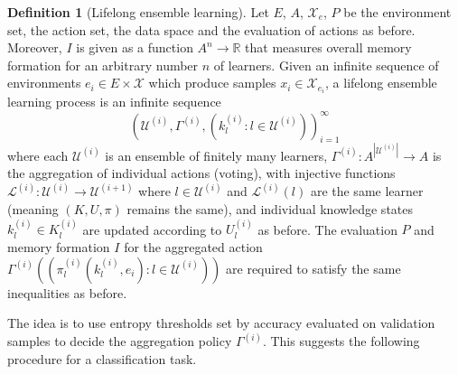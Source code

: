 \documentclass{article}
\theoremstyle{plain}
\theoremstyle{definition}
\newtheorem{definition}[theorem]{Definition}
\theoremstyle{remark}
\newcommand{\R}{\mathbb{R}}
\newcommand{\cX}{\mathcal{X}}
\newcommand{\cU}{\mathcal{U}}
\newcommand{\cL}{\mathcal{L}}
\begin{document}
\begin{definition}[Lifelong ensemble learning]
	\label{def:lifelong_ensemble}
	Let $E$, $A$, $\cX_e$, $P$ be the environment set, the action set, the data space and the evaluation of actions as before. Moreover, $I$ is given as a function $A^n \to \R$ that measures overall memory formation for an arbitrary number $n$ of learners.
	Given an infinite sequence of environments $e_i \in E \times \cX$ which produce samples $x_i \in \cX_{e_i}$,
	a lifelong ensemble learning process is an infinite sequence 
	$$(\cU^{(i)},\Gamma^{(i)}, (k^{(i)}_l:l \in \cU^{(i)}))_{i=1}^\infty$$ 
	where each $\cU^{(i)}$ is an ensemble of finitely many learners, $\Gamma^{(i)}: A^{|\cU^{(i)}|} \to A$ is the aggregation of individual actions (voting), with injective functions $\cL^{(i)}: \cU^{(i)}\to \cU^{(i+1)}$ where $l\in \cU^{(i)}$ and $\cL^{(i)}(l)$ are the same learner (meaning $(K,U,\pi)$ remains the same), and individual knowledge states $k^{(i)}_l\in K^{(i)}_l$ are updated according to $U^{(i)}_l$ as before. The evaluation $P$ and memory formation $I$ for the aggregated action $\Gamma^{(i)}((\pi^{(i)}_l(k_l^{(i)},e_i): l \in \cU^{(i)}))$ are required to satisfy the same inequalities as before.
\end{definition}

The idea is to use entropy thresholds set by accuracy evaluated on validation samples to decide the aggregation policy $\Gamma^{(i)}$. This suggests the following procedure for a classification task.
\end{document}
